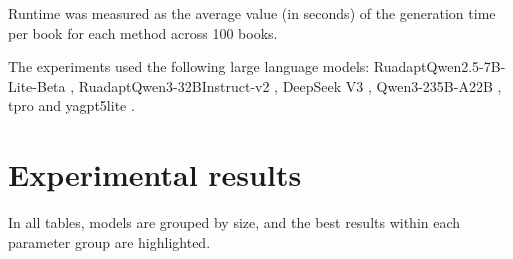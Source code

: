 \documentclass{superfri}
\begin{document}
Runtime was measured as the average value (in seconds) of the generation time per book for each method across 100 books.

The experiments used the following large language models:
RuadaptQwen2.5-7B-Lite-Beta \cite{ruadapt},
RuadaptQwen3-32BInstruct-v2 \cite{ruadapt},
DeepSeek V3 \cite{deepseek},
Qwen3-235B-A22B \cite{qwen3},
tpro \cite{tpro} and yagpt5lite \cite{yagpt}.


\section{Experimental results}
In all tables, models are grouped by size, and the best results within each parameter group are highlighted.
\end{document}
